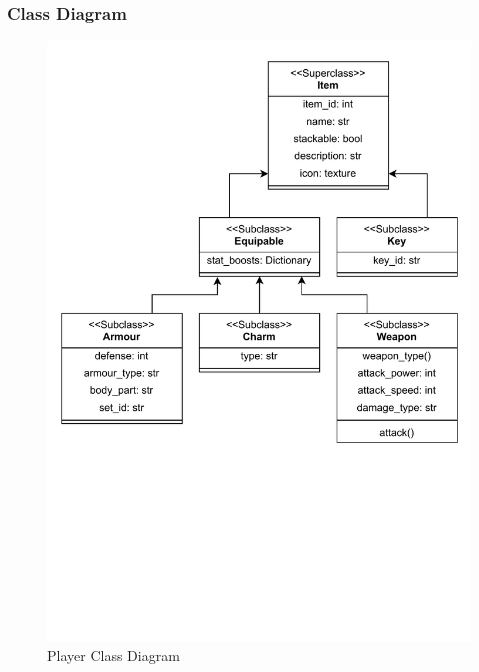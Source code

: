 \documentclass{article}
\begin{document}
        \subsubsection{Class Diagram}
        \begin{figure}[H]
                \centering
                \includegraphics[width = 0.9\columnwidth, clip, trim = 0 270 0 25]{images/design/Item_Class_Diagram.pdf}
                \caption{Player Class Diagram}
                \label{fig:ie_5}
        \end{figure}
\end{document}
